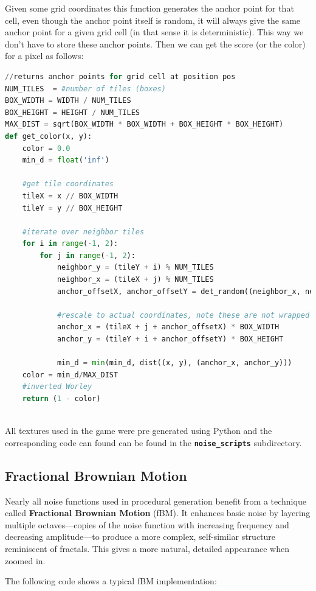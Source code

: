 Given some grid coordinates this function generates the anchor point for that cell, even though the anchor point itself is random, it will always give the same anchor point for a given grid cell (in that sense it is deterministic). This way we don't have to store these anchor points. Then we can get the score (or the color) for a pixel as follows:

\begin{lstlisting}[language=Python]
//returns anchor points for grid cell at position pos
NUM_TILES  = #number of tiles (boxes)
BOX_WIDTH = WIDTH / NUM_TILES
BOX_HEIGHT = HEIGHT / NUM_TILES
MAX_DIST = sqrt(BOX_WIDTH * BOX_WIDTH + BOX_HEIGHT * BOX_HEIGHT)
def get_color(x, y):
	color = 0.0
	min_d = float('inf')

	#get tile coordinates
	tileX = x // BOX_WIDTH 
	tileY = y // BOX_HEIGHT

	#iterate over neighbor tiles
	for i in range(-1, 2):
		for j in range(-1, 2):
			neighbor_y = (tileY + i) % NUM_TILES 
			neighbor_x = (tileX + j) % NUM_TILES
			anchor_offsetX, anchor_offsetY = det_random((neighbor_x, neighbor_y))

			#rescale to actual coordinates, note these are not wrapped
			anchor_x = (tileX + j + anchor_offsetX) * BOX_WIDTH
			anchor_y = (tileY + i + anchor_offsetY) * BOX_HEIGHT

			min_d = min(min_d, dist((x, y), (anchor_x, anchor_y)))
	color = min_d/MAX_DIST
	#inverted Worley
	return (1 - color)
			
\end{lstlisting}

All textures used in the game were pre generated using Python and the corresponding code can found can be found in the \textbf{\texttt{noise\_scripts}} subdirectory.
\subsection{Fractional Brownian Motion}
Nearly all noise functions used in procedural generation benefit from a technique called \textbf{Fractional Brownian Motion} (fBM). It enhances basic noise by layering multiple octaves—copies of the noise function with increasing frequency and decreasing amplitude—to produce a more complex, self-similar structure reminiscent of fractals. This gives a more natural, detailed appearance when zoomed in.

The following code shows a typical fBM implementation:

